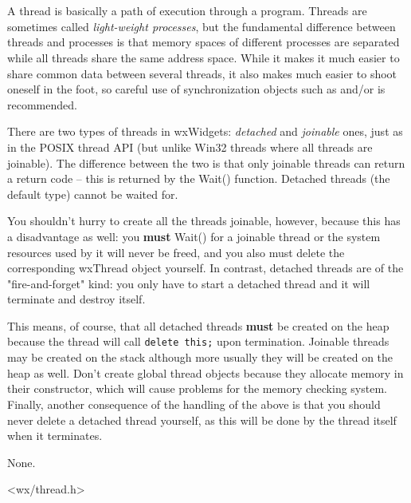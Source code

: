 \section{}\label{wxthread}

A thread is basically a path of execution through a program. Threads are
sometimes called {\it light-weight processes}, but the fundamental difference
between threads and processes is that memory spaces of different processes are
separated while all threads share the same address space. While it makes it
much easier to share common data between several threads, it also makes much
easier to shoot oneself in the foot, so careful use of synchronization objects
such as  and/or  is recommended.

There are two types of threads in wxWidgets: {\it detached} and {\it joinable}
ones, just as in the POSIX thread API (but unlike Win32 threads where all threads
are joinable). The difference between the two is that only joinable threads
can return a return code -- this is returned by the Wait() function. Detached
threads (the default type) cannot be waited for.

You shouldn't hurry to create all the threads joinable, however, because this
has a disadvantage as well: you {\bf must} Wait() for a joinable thread or the
system resources used by it will never be freed, and you also must delete the
corresponding wxThread object yourself. In contrast, detached threads are of the
"fire-and-forget" kind: you only have to start a detached thread and it will
terminate and destroy itself.

This means, of course, that all detached threads {\bf must} be created on the
heap because the thread will call {\tt delete this;} upon termination. Joinable
threads may be created on the stack although more usually they will be created
on the heap as well. Don't create global thread objects because they allocate
memory in their constructor, which will cause problems for the memory checking
system. Finally, another consequence of the handling of the above is that you
should never delete a detached thread yourself, as this will be done by the
thread itself when it terminates.


None.


<wx/thread.h>


